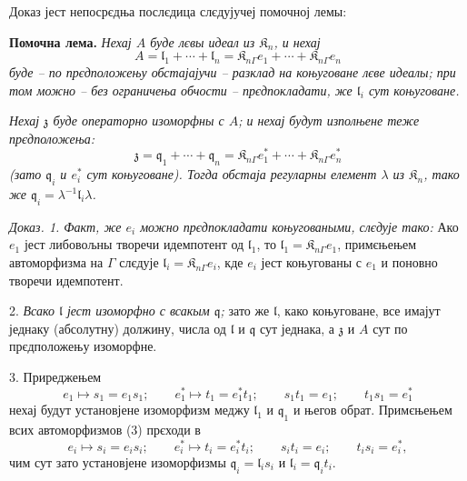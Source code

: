\documentclass[11pt]{article}
\begin{document}
Доказ јест непосрєдња послєдица слєдујучеј помочној лемы:

\textbf{Помочна лема.} \emph{Нехај \(A\) буде лєвы идеал из \(\mathfrak K_n\), и нехај}
\[
A=\mathfrak l_1+\cdots+\mathfrak l_n
=\mathfrak K_{n\Gamma}e_1+\cdots+\mathfrak K_{n\Gamma}e_n
\]
\emph{буде -- по прєдположењу обстајајучи -- разклад на коњуговане лєве идеалы; при том можно -- без ограничења обчости -- прєдпокладати, же \(\mathfrak l_i\) сут коњуговане.}

\emph{Нехај \(\mathfrak z\) буде операторно изоморфны с \(A\); и нехај будут изполњене теже прєдположења:}
\[
\mathfrak z=\mathfrak q_1+\cdots+\mathfrak q_n
=\mathfrak K_{n\Gamma}e_1^*+\cdots+\mathfrak K_{n\Gamma}e_n^*
\]
\emph{(зато \(\mathfrak q_i\) и \(e_i^*\) сут коњуговане). Тогда обстаја регуларны елемент \(\lambda\) из \(\mathfrak K_n\), тако же \(\mathfrak q_i=\lambda^{-1}\mathfrak l_i\lambda\).}

\emph{Доказ. 1. Факт, же \(e_i\) можно прєдпокладати коњуговаными, слєдује тако:} Ако \(e_1\) јест либовољны творечи идемпотент од \(\mathfrak l_1\), то \(\mathfrak l_1=\mathfrak K_{n\Gamma}e_1\), примєњењем автоморфизма на \(\Gamma\) слєдује \(\mathfrak l_i=\mathfrak K_{n\Gamma}e_i\), кде \(e_i\) јест коњугованы с \(e_1\) и поновно творечи идемпотент.

2. \emph{Всако \(\mathfrak l\) јест изоморфно с всакым \(\mathfrak q\);} зато же \(\mathfrak l\), како коњуговане, все имајут једнаку (абсолутну) должину, числа од \(\mathfrak l\) и \(\mathfrak q\) сут једнака, а \(\mathfrak z\) и \(A\) сут по прєдположењу изоморфне.

3. Приреджењем
\[
\tag{3}
e_1\mapsto s_1=e_1s_1;\qquad
e_1^*\mapsto t_1=e_1^*t_1;\qquad
s_1t_1=e_1;\qquad
t_1s_1=e_1^*
\]
нехај будут установјене изоморфизм меджу \(\mathfrak l_1\) и \(\mathfrak q_1\) и његов обрат. Примєњењем всих автоморфизмов (3) прєходи в
\[
e_i\mapsto s_i=e_is_i;\qquad
e_i^*\mapsto t_i=e_i^*t_i;\qquad
s_it_i=e_i;\qquad
t_is_i=e_i^*,
\]
чим сут зато установјене изоморфизмы \(\mathfrak q_i=\mathfrak l_is_i\) и \(\mathfrak l_i=\mathfrak q_it_i\).
\end{document}
